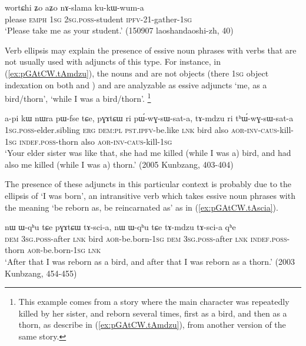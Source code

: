 \begin{exe}
\ex \label{ex:naslama.kukWwuma}
 \gll wortɕhi ʑo aʑo nɤ-slama ku-kɯ-wum-a \\
please \textsc{emph} \textsc{1sg} \textsc{2sg}.\textsc{poss}-student \textsc{ipfv}-2\fl{}1-gather-\textsc{1sg} \\
\glt `Please take me as your student.' (150907 laoshandaoshi-zh, 40)
\end{exe}

Verb ellipsis may explain the presence of essive noun phrases with verbs that are not usually used with adjuncts of this type. For instance, in (\ref{ex:pGAtCW.tAmdzu}), the nouns  and  are not objects (there \textsc{1sg} object indexation on both  and ) and are analyzable as essive adjuncts `me, as a bird/thorn', `while I was a bird/thorn'. \footnote{This example comes from a story where the main character was repeatedly killed by her sister, and reborn several times, first as a bird, and then as a thorn, as describe in (\ref{ex:pGAtCW.tAmdzu}), from another version of the same story. }  

\begin{exe}
\ex \label{ex:pGAtCW.tAmdzu}
\gll a-pi kɯ nɯra pɯ-fse tɕe, pɣɤtɕɯ ri pɯ́-wɣ-sɯ-sat-a,  tɤ-mdzu ri tʰɯ́-wɣ-sɯ-sat-a  \\
\textsc{1sg}.\textsc{poss}-elder.sibling \textsc{erg} \textsc{dem}:\textsc{pl} \textsc{pst}.\textsc{ipfv}-be.like \textsc{lnk} bird also \textsc{aor}-\textsc{inv}-\textsc{caus}-kill-\textsc{1sg} \textsc{indef}.\textsc{poss}-thorn also \textsc{aor}-\textsc{inv}-\textsc{caus}-kill-\textsc{1sg} \\
\glt `Your elder sister was like that, she had me killed (while I was a) bird, and had also me killed (while I was a) thorn.' (2005 Kunbzang, 403-404)
\end{exe}
 
The presence of these adjuncts in this particular context is probably due to the ellipsis of  `I was born', an intransitive verb which takes essive noun phrases with the meaning `be reborn as, be reincarnated as' as in (\ref{ex:pGAtCW.tAscia}).
 
 \begin{exe}
\ex \label{ex:pGAtCW.tAscia}
\gll  nɯ ɯ-qʰu tɕe pɣɤtɕɯ tɤ-sci-a, nɯ ɯ-qʰu tɕe tɤ-mdzu tɤ-sci-a qʰe \\
\textsc{dem} \textsc{3sg}.\textsc{poss}-after \textsc{lnk} bird \textsc{aor}-be.born-\textsc{1sg} \textsc{dem} \textsc{3sg}.\textsc{poss}-after \textsc{lnk} \textsc{indef}.\textsc{poss}-thorn \textsc{aor}-be.born-\textsc{1sg}  \textsc{lnk} \\
 \glt `After that I was reborn as a bird, and after that I was reborn as a thorn.' (2003 Kunbzang, 454-455)
 \end{exe}

